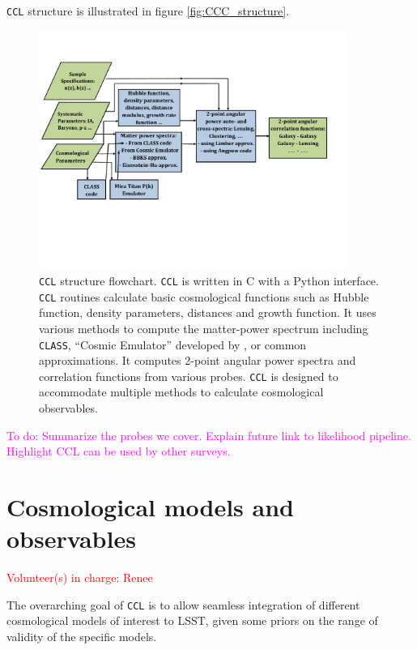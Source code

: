 \documentclass[\docopts]{\docclass}
\newcommand{\todo}[1]{\textcolor{magenta}{To do: #1}}
\newcommand{\vol}[1]{\textcolor{red}{Volunteer(s) in charge: #1}}
\newcommand{\ccl}{{\tt CCL}\xspace}
\begin{document}
\ccl structure is illustrated in figure \ref{fig:CCC_structure}.

\begin{figure}
\centering
\includegraphics[width=0.9\textwidth]{CCL_Flowchart3}
\caption{\ccl structure flowchart. \ccl is written in C with a Python interface. \ccl routines calculate basic cosmological functions such as Hubble function, density parameters, distances and growth function. It uses various methods to compute the matter-power spectrum including {\tt CLASS}, ``Cosmic Emulator'' developed by \citet{Lawrence17}, or common approximations. It computes 2-point angular power spectra and correlation functions from various probes. \ccl is designed to accommodate multiple methods to calculate cosmological observables.}
\label{fig:CCL_structure}
\end{figure}


\todo{Summarize the probes we cover. Explain future link to likelihood pipeline. Highlight CCL can be used by other surveys.}

\section{Cosmological models and observables}
\vol{Renee}

The overarching goal of \ccl is to allow seamless integration of different cosmological models of interest to LSST, given some priors on the range of validity of the specific models.
\end{document}
